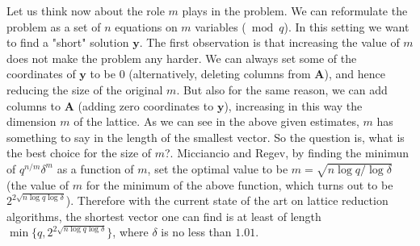 \documentclass[11pt]{article}
\begin{document}
Let us think now about the role $m$ plays in the problem. We can reformulate the problem as a set of $n$ equations on $m$ variables ($\bmod q$). In this setting we want to find a "short" solution $\boldsymbol{y}$. The first observation is that increasing the value of $m$ does not make the problem any harder. We can always set some of the coordinates of $\boldsymbol{y}$ to be $0$ (alternatively, deleting columns from $\boldsymbol{A}$), and hence reducing the size of the original $m$. But also for the same reason, we can add columns to $\boldsymbol{A}$ (adding zero coordinates to $\boldsymbol{y}$), increasing in this way the dimension $m$ of the lattice. As we can see in the above given estimates, $m$ has something to say in the length of the smallest vector. So the question is, what is the best choice for the size of $m$?. Micciancio and Regev, by finding the minimun of $q^{n/m} \delta^m$ as a function of $m$, set the optimal value to be $m = \sqrt{n \log{q} / \log{\delta}}$ (the value of $m$ for the minimum of the above function, which turns out to be $2^{2\sqrt{n \log{q} \log{\delta}}}$). Therefore with the current state of the art on lattice reduction algorithms, the shortest vector one can find is at least of length $\min \{q,2^{2 \sqrt{n \log{q} \log{\delta}}} \}$, where $\delta$ is no less than $1.01$.
\end{document}
